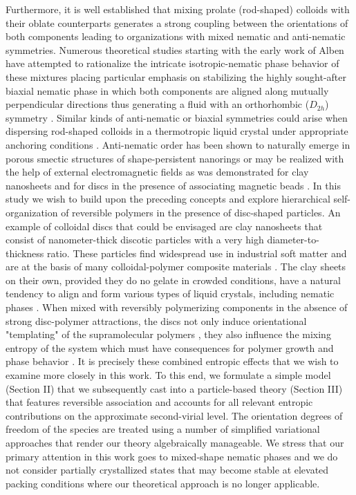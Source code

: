 Furthermore, it is well established that mixing prolate (rod-shaped) colloids with their  oblate  counterparts  generates a strong coupling between the  orientations of both components leading to organizations with mixed nematic and anti-nematic symmetries. Numerous theoretical studies starting with the early work of Alben \cite{alben1973} have attempted to rationalize the intricate isotropic-nematic  phase behavior of these mixtures  placing particular emphasis on stabilizing the highly sought-after biaxial nematic phase in which both components are aligned along mutually perpendicular directions thus generating a fluid with an orthorhombic ($D_{2h}$) symmetry  \cite{stroobants1984,campallenbolhuisfrenkel,sokolova1997,vanakaras1998,vanakaras2001, matsuda2003,jacksonbiaxrev,varga2002,galindo2,wensinkrodplate,wensinkbiaxial}. Similar kinds of  anti-nematic or biaxial symmetries could arise when dispersing rod-shaped colloids in a thermotropic liquid crystal under appropriate anchoring conditions \cite{matsuyama2010,mundoor2018}. Anti-nematic order has been shown to naturally emerge in porous smectic structures of  shape-persistent nanorings \cite{avendano2016,wensinkavendano2016} or may be realized with the help of external electromagnetic fields as was demonstrated for clay nanosheets \cite{dozov2011} and for discs in the presence of associating magnetic beads \cite{perouklapp2020}.  In this study we wish to build upon the preceding concepts and explore hierarchical self-organization of reversible polymers in the presence of disc-shaped particles. An example of colloidal discs that could be envisaged are clay nanosheets that consist of nanometer-thick discotic particles with a very high diameter-to-thickness ratio. These particles find widespread use in industrial soft matter and are at the basis of many colloidal-polymer composite materials \cite{balazs1998,ginzburg2000}. The clay sheets on their own, provided they do no gelate in crowded conditions,  have a natural tendency to align and form various types of liquid crystals, including nematic phases \cite{kooij1998,gabriel2005,michot2006,paineau_jpcb2009}. When mixed with  reversibly polymerizing components in the absence of strong disc-polymer attractions,  the discs not only induce orientational "templating" of the supramolecular polymers \cite{asdonk2017}, they also influence the mixing entropy of the system which must have  consequences for polymer growth and  phase behavior \cite{taylorherzfeld1991,vdschoot1994epl}. It is precisely these combined entropic effects that we wish to examine more closely in this work. To this end, we formulate a simple model (Section II) that we subsequently cast into  a  particle-based theory (Section III) that features reversible association and accounts for all relevant entropic contributions on the approximate second-virial level. The orientation degrees of freedom of the species are treated using a number of simplified variational approaches that render our theory algebraically manageable.    We stress that our primary attention in this work goes to mixed-shape nematic phases and we do not consider partially crystallized states that may become stable at elevated packing conditions where our theoretical approach is no longer applicable.


